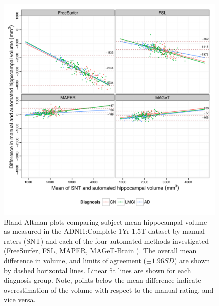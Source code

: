 \documentclass{article}\usepackage{graphicx, color}
\makeatletter
\def\maxwidth{ %
  \ifdim\Gin@nat@width>\linewidth
    \linewidth
  \else
    \Gin@nat@width
  \fi
}
\newenvironment{knitrout}{}{} %
\newcommand{\mb}{MAGeT-Brain }
\newcommand{\adnidataset}{ADNI1:Complete 1Yr 1.5T }
\makeatother
\begin{document}
\begin{figure}
\begin{knitrout}
\color{fgcolor}

{\centering \includegraphics[width=\maxwidth]{figure/ADNI-Bland-Altman} 

}



\end{knitrout}

  \caption{Bland-Altman plots comparing subject mean hippocampal volume as
measured in the \adnidataset dataset by manual raters (SNT) and each of the four
automated methods investigated (FreeSurfer, FSL, MAPER, \mb). The overall mean
difference in volume, and limits of agreement ($\pm 1.96SD$) are shown by dashed
horizontal lines. Linear fit lines are shown for each diagnosis group. Note,
points below the mean difference indicate overestimation of the volume with
respect to the manual rating, and vice versa. }

  \label{fig:ADNI-Bland-Altman}
\end{figure}
\end{document}
